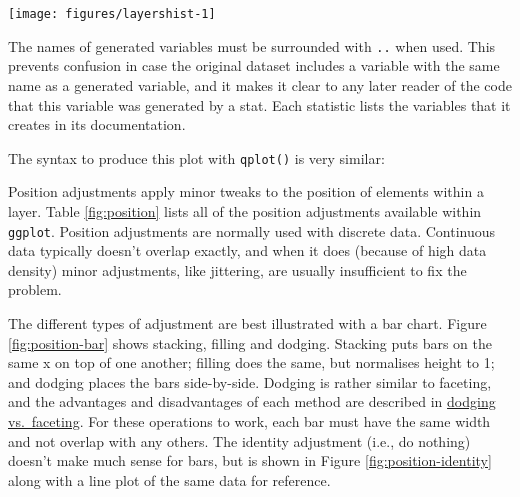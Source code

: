 \begin{flushleft}\texttt{[image: figures/layershist-1]} \end{flushleft}

The names of generated variables must be surrounded with \texttt{..}
when used. This prevents confusion in case the original dataset includes
a variable with the same name as a generated variable, and it makes it
clear to any later reader of the code that this variable was generated
by a stat. Each statistic lists the variables that it creates in its
documentation. 

The syntax to produce this plot with \texttt{qplot()} is very similar:

\begin{Shaded}
\begin{Highlighting}[]
 \NormalTok{, }
   \NormalTok{)}
\end{Highlighting}
\end{Shaded}


Position adjustments apply minor tweaks to the position of elements
within a layer. Table \ref{fig:position} lists all of the position
adjustments available within \texttt{ggplot}. Position adjustments are
normally used with discrete data. Continuous data typically doesn't
overlap exactly, and when it does (because of high data density) minor
adjustments, like jittering, are usually insufficient to fix the
problem.  



The different types of adjustment are best illustrated with a bar chart.
Figure \ref{fig:position-bar} shows stacking, filling and dodging.
Stacking puts bars on the same x on top of one another; filling does the
same, but normalises height to 1; and dodging places the bars
side-by-side. Dodging is rather similar to faceting, and the advantages
and disadvantages of each method are described in
\hyperref[sub:dodge-vs-facet]{dodging vs.~faceting}. For these
operations to work, each bar must have the same width and not overlap
with any others. The identity adjustment (i.e., do nothing) doesn't make
much sense for bars, but is shown in Figure \ref{fig:position-identity}
along with a line plot of the same data for reference. 
 
  

